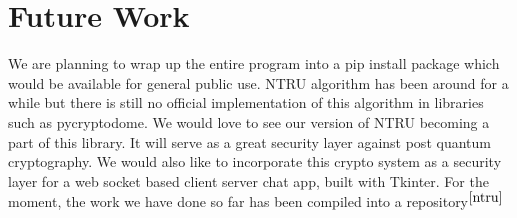 \documentclass[a4paper,12pt]{article}
\begin{document}
\section{Future Work}
\begin{flushleft}
We are planning to wrap up the entire program into a pip install package which would be available for general public use. NTRU algorithm has been around for a while but there is still no official implementation of this algorithm in libraries such as pycryptodome. We would love to see our version of NTRU becoming a part of this library. It will serve as a great security layer against post quantum cryptography. We would also like to incorporate this crypto system as a security layer for a web socket based client server chat app, built with Tkinter. For the moment, the work we have done so far has been compiled into a repository$^{\cite{ntru}}$
\end{flushleft}


\end{document}

